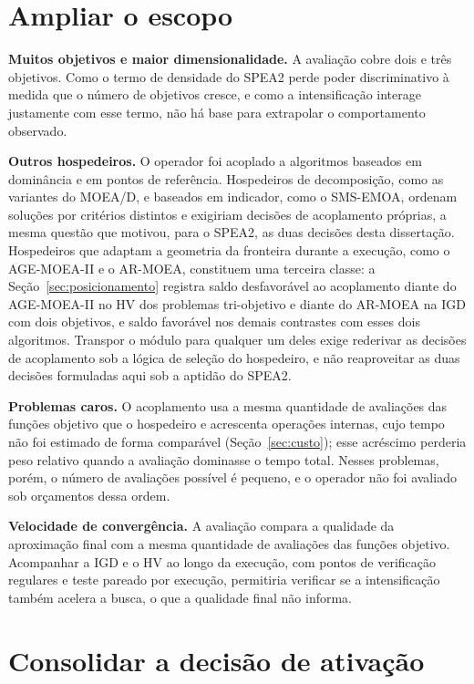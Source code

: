 \section{Ampliar o escopo}

\textbf{Muitos objetivos e maior dimensionalidade.} A avaliação cobre dois e três objetivos. Como o termo de densidade do SPEA2 perde poder discriminativo à medida que o número de objetivos cresce, e como a intensificação interage justamente com esse termo, não há base para extrapolar o comportamento observado.

\textbf{Outros hospedeiros.} O operador foi acoplado a algoritmos baseados em dominância e em pontos de referência. Hospedeiros de decomposição, como as variantes do MOEA/D, e baseados em indicador, como o SMS-EMOA, ordenam soluções por critérios distintos e exigiriam decisões de acoplamento próprias, a mesma questão que motivou, para o SPEA2, as duas decisões desta dissertação. Hospedeiros que adaptam a geometria da fronteira durante a execução, como o AGE-MOEA-II e o AR-MOEA, constituem uma terceira classe: a Seção~\ref{sec:posicionamento} registra saldo desfavorável ao acoplamento diante do AGE-MOEA-II no HV dos problemas tri-objetivo e diante do AR-MOEA na IGD com dois objetivos, e saldo favorável nos demais contrastes com esses dois algoritmos. Transpor o módulo para qualquer um deles exige rederivar as decisões de acoplamento sob a lógica de seleção do hospedeiro, e não reaproveitar as duas decisões formuladas aqui sob a aptidão do SPEA2.

\textbf{Problemas caros.} O acoplamento usa a mesma quantidade de avaliações das funções objetivo que o hospedeiro e acrescenta operações internas, cujo tempo não foi estimado de forma comparável (Seção~\ref{sec:custo}); esse acréscimo perderia peso relativo quando a avaliação dominasse o tempo total. Nesses problemas, porém, o número de avaliações possível é pequeno, e o operador não foi avaliado sob orçamentos dessa ordem.

\textbf{Velocidade de convergência.} A avaliação compara a qualidade da aproximação final com a mesma quantidade de avaliações das funções objetivo. Acompanhar a IGD e o HV ao longo da execução, com pontos de verificação regulares e teste pareado por execução, permitiria verificar se a intensificação também acelera a busca, o que a qualidade final não informa.

\section{Consolidar a decisão de ativação}

